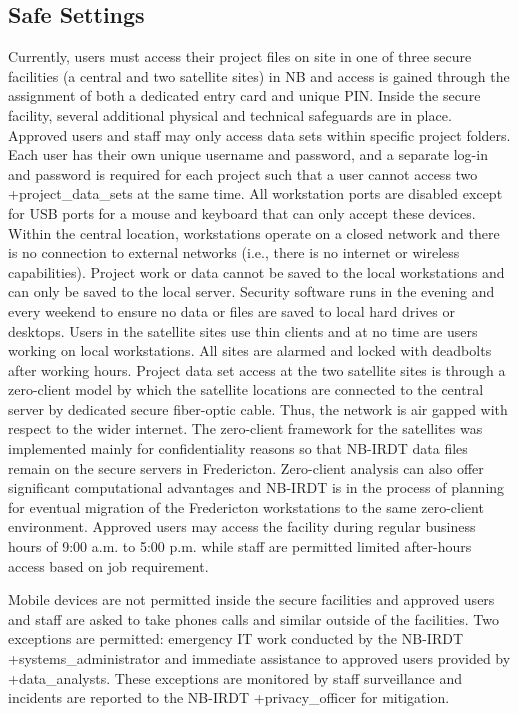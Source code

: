 \documentclass[
]{book}
\begin{document}
\hypertarget{safe-settings-2}{%
\subsection{Safe Settings}\label{safe-settings-2}}

Currently, users must access their project files on site in one of three secure facilities (a central and two satellite sites) in NB and access is gained through the assignment of both a dedicated entry card and unique PIN. Inside the secure facility, several additional physical and technical safeguards are in place. Approved users and staff may only access data sets within specific project folders. Each user has their own unique username and password, and a separate log-in and password is required for each project such that a user cannot access two +project\_data\_sets\textbar{} at the same time. All workstation ports are disabled except for USB ports for a mouse and keyboard that can only accept these devices. Within the central location, workstations operate on a closed network and there is no connection to external networks (i.e., there is no internet or wireless capabilities). Project work or data cannot be saved to the local workstations and can only be saved to the local server. Security software runs in the evening and every weekend to ensure no data or files are saved to local hard drives or desktops. Users in the satellite sites use thin clients and at no time are users working on local workstations. All sites are alarmed and locked with deadbolts after working hours. Project data set access at the two satellite sites is through a zero-client model by which the satellite locations are connected to the central server by dedicated secure fiber-optic cable. Thus, the network is air gapped with respect to the wider internet. The zero-client framework for the satellites was implemented mainly for confidentiality reasons so that NB-IRDT data files remain on the secure servers in Fredericton. Zero-client analysis can also offer significant computational advantages and NB-IRDT is in the process of planning for eventual migration of the Fredericton workstations to the same zero-client environment. Approved users may access the facility during regular business hours of 9:00 a.m. to 5:00 p.m. while staff are permitted limited after-hours access based on job requirement.

Mobile devices are not permitted inside the secure facilities and approved users and staff are asked to take phones calls and similar outside of the facilities. Two exceptions are permitted: emergency IT work conducted by the NB-IRDT +systems\_administrator\textbar{} and immediate assistance to approved users provided by +data\_analysts\textbar. These exceptions are monitored by staff surveillance and incidents are reported to the NB-IRDT +privacy\_officer\textbar{} for mitigation.
\end{document}
